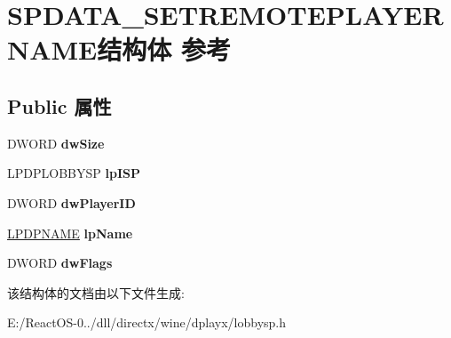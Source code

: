 \hypertarget{struct_s_p_d_a_t_a___s_e_t_r_e_m_o_t_e_p_l_a_y_e_r_n_a_m_e}{}\section{S\+P\+D\+A\+T\+A\+\_\+\+S\+E\+T\+R\+E\+M\+O\+T\+E\+P\+L\+A\+Y\+E\+R\+N\+A\+M\+E结构体 参考}
\label{struct_s_p_d_a_t_a___s_e_t_r_e_m_o_t_e_p_l_a_y_e_r_n_a_m_e}
\subsection*{Public 属性}
\begin{DoxyCompactItemize}
\item 
\mbox{\label{struct_s_p_d_a_t_a___s_e_t_r_e_m_o_t_e_p_l_a_y_e_r_n_a_m_e_a22b10c122e9197907e6fffc62848d2df}} 
D\+W\+O\+RD {\bfseries dw\+Size}
\item 
\mbox{\label{struct_s_p_d_a_t_a___s_e_t_r_e_m_o_t_e_p_l_a_y_e_r_n_a_m_e_abeb38e8a56e4e2870d3949eba4d40f0e}} 
L\+P\+D\+P\+L\+O\+B\+B\+Y\+SP {\bfseries lp\+I\+SP}
\item 
\mbox{\label{struct_s_p_d_a_t_a___s_e_t_r_e_m_o_t_e_p_l_a_y_e_r_n_a_m_e_a226b476a93621a015bc544ae439fbcf2}} 
D\+W\+O\+RD {\bfseries dw\+Player\+ID}
\item 
\mbox{\label{struct_s_p_d_a_t_a___s_e_t_r_e_m_o_t_e_p_l_a_y_e_r_n_a_m_e_af87a99dae65a80fabf573a5b9ed145d4}} 
\hyperlink{structtag_d_p_n_a_m_e}{L\+P\+D\+P\+N\+A\+ME} {\bfseries lp\+Name}
\item 
\mbox{\label{struct_s_p_d_a_t_a___s_e_t_r_e_m_o_t_e_p_l_a_y_e_r_n_a_m_e_aaa9e0bb7dcadfb5f8939a3e1aa56064d}} 
D\+W\+O\+RD {\bfseries dw\+Flags}
\end{DoxyCompactItemize}


该结构体的文档由以下文件生成\+:\begin{DoxyCompactItemize}
\item 
E\+:/\+React\+O\+S-\/0../dll/directx/wine/dplayx/lobbysp.\+h\end{DoxyCompactItemize}
